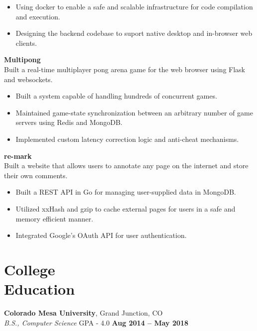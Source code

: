 \documentclass[margin,line]{resume}
\begin{document}
\begin{resume}
	\begin{itemize}
	\item Using docker to enable a safe and scalable infrastructure for code
          compilation and execution.
    \item Designing the backend codebase to suport native desktop and in-browser
          web clients.
	\end{itemize}

    \textbf{Multipong}\\
    Built a real-time multiplayer pong arena game for the web browser using Flask and
    websockets.

        \begin{itemize}
        \item Built a system capable of handling hundreds of concurrent games.
        \item Maintained game-state synchronization between an arbitrary number of
              game servers using Redis and MongoDB.
        \item Implemented custom latency correction logic and anti-cheat mechanisms.
	\end{itemize}


    \textbf{re-mark}\\
    Built a website that allows users to annotate any page on the internet
    and store their own comments.

        \begin{itemize}
        \item Built a REST API in Go for managing user-supplied data in MongoDB.
        \item Utilized xxHash and gzip to cache external pages for users in
              a safe and memory efficient manner.
        \item Integrated Google's OAuth API for user authentication.
        \end{itemize}

    \section{\mysidestyle College\\Education}

    \textbf{Colorado Mesa University}, Grand Junction, CO \vspace{2mm}\\\vspace{1mm}%
    \textsl{B.S., Computer Science} GPA - 4.0 \hfill \textbf{Aug 2014 -- May 2018}


\end{resume}
\end{document}
